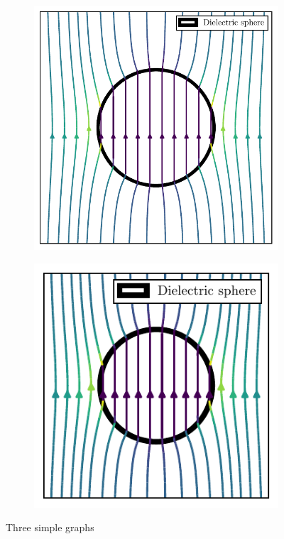 \begin{figure}[!htbp]
  \centering
  \begin{subfigure}[b]{0.48\textwidth}
      \centering
      \includegraphics[width=\textwidth]{./../figures/field-dielectric-sphere.pdf}
  \end{subfigure}
  \hfill
  \begin{subfigure}[b]{0.48\textwidth}
      \centering
      \includegraphics[width=\textwidth]{./../figures/field-dielectric-sphere-small.pdf}
  \end{subfigure}
  \caption{Three simple graphs}
  \label{fig:test-figure}
\end{figure}